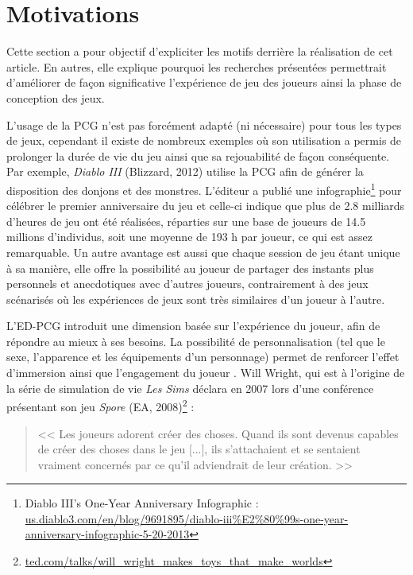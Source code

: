 \documentclass[a4paper,11pt]{article}
\begin{document}
    \section{Motivations}\label{section:motivations}
      
      Cette section a pour objectif d'expliciter les motifs derrière la réalisation de cet article.
      En autres, elle explique pourquoi les recherches présentées permettrait d'améliorer de façon significative l'expérience de jeu des joueurs ainsi la phase de conception des jeux. 

      L'usage de la PCG n'est pas forcément adapté (ni nécessaire) pour tous les types de jeux, cependant il existe de nombreux exemples où son utilisation a permis de prolonger la durée de vie du jeu ainsi que sa rejouabilité de façon conséquente.
      Par exemple, \textit{Diablo III} (Blizzard, 2012) utilise la PCG afin de générer la disposition des donjons et des monstres. 
      L'éditeur a publié une infographie\footnote{Diablo III’s One-Year Anniversary Infographic : \url{us.diablo3.com/en/blog/9691895/diablo-iii\%E2\%80\%99s-one-year-anniversary-infographic-5-20-2013}} pour célébrer le premier anniversaire du jeu et celle-ci indique que plus de 2.8 milliards d'heures de jeu ont été réalisées, réparties sur une base de joueurs de 14.5 millions d'individus, soit une moyenne de 193 h par joueur, ce qui est assez remarquable.
      Un autre avantage est aussi que chaque session de jeu étant unique à sa manière, elle offre la possibilité au joueur de partager des instants plus personnels et anecdotiques avec d'autres joueurs, contrairement à des jeux scénarisés où les expériences de jeux sont très similaires d'un joueur à l'autre.

      L'ED-PCG introduit une dimension basée sur l'expérience du joueur, afin de répondre au mieux à ses besoins.
      La possibilité de personnalisation (tel que le sexe, l'apparence et les équipements d'un personnage) permet de renforcer l'effet d'immersion ainsi que l'engagement du joueur \cite{Teng}.
      Will Wright, qui est à l'origine de la série de simulation de vie \textit{Les Sims} déclara en 2007 lors d'une conférence présentant son jeu \textit{Spore} (EA, 2008)\footnote{\url{ted.com/talks/will_wright_makes_toys_that_make_worlds}} :
      
      \begin{quote}
        \vspace{-1em}
        << Les joueurs adorent créer des choses.
        Quand ils sont devenus capables de créer des choses dans le jeu [...], ils s'attachaient et se sentaient vraiment concernés par ce qu'il adviendrait de leur création. >>
        \vspace{-1em}
      \end{quote}
      
\end{document}
